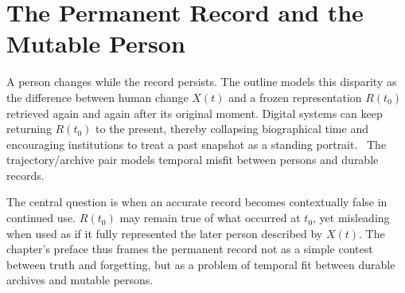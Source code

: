 
\chapter{The Permanent Record and the Mutable Person}
\label{ch:ch068}


A person changes while the record persists. The outline models this disparity as the difference between human change \(X(t)\) and a frozen representation \(R(t_0)\) retrieved again and again after its original moment. Digital systems can keep returning \(R(t_0)\) to the present, thereby collapsing biographical time and encouraging institutions to treat a past snapshot as a standing portrait.
\ToyModel\ The trajectory/archive pair models temporal misfit between persons and durable records.

The central question is when an accurate record becomes contextually false in continued use. \(R(t_0)\) may remain true of what occurred at \(t_0\), yet misleading when used as if it fully represented the later person described by \(X(t)\). The chapter's preface thus frames the permanent record not as a simple contest between truth and forgetting, but as a problem of temporal fit between durable archives and mutable persons.
